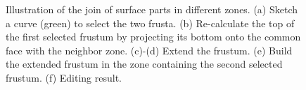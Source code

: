 \begin{figure} [htbp]
  \caption{Illustration of the join of surface parts in different zones.
  (a) Sketch a curve (green) to select the two frusta.
  (b) Re-calculate the top of the first selected frustum by projecting its bottom onto the common face with the neighbor zone.
  (c)-(d) Extend the frustum.
  (e) Build the extended frustum in the zone containing the second selected frustum.
  (f) Editing result.}
  \label{fig:join2zone}
\end{figure}

